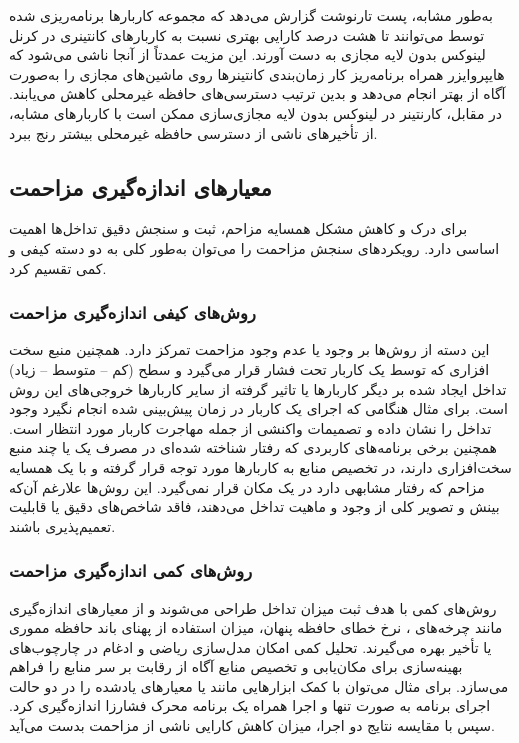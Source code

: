 به‌طور مشابه، پست تارنوشت  گزارش می‌دهد\cite{vmware2019vSphere} که مجموعه کاربارها برنامه‌ریزی شده توسط  می‌توانند تا هشت درصد کارایی بهتری نسبت به کاربارهای کانتینری در کرنل لینوکس بدون لایه مجازی به دست آورند. این مزیت عمدتاً از آنجا ناشی می‌شود که هایپروایزر  همراه برنامه‌ریز  کار زمان‌بندی کانتینرها روی ماشین‌های مجازی را به‌صورت آگاه از  بهتر انجام می‌دهد و بدین ترتیب دسترسی‌های حافظه غیرمحلی کاهش می‌یابند. در مقابل، کارنتینر در لینوکس بدون لایه مجازی‌سازی ممکن است با کاربارهای مشابه، از تأخیرهای ناشی از دسترسی حافظه غیرمحلی بیشتر رنج ببرد.

\subsection{معیارهای اندازه‌گیری مزاحمت}

برای درک و کاهش مشکل همسایه مزاحم، ثبت و سنجش دقیق تداخل‌ها اهمیت اساسی دارد. رویکردهای سنجش مزاحمت را می‌توان به‌طور کلی به دو دسته کیفی و کمی تقسیم کرد.

\subsubsection{روش‌های کیفی اندازه‌گیری مزاحمت}

این دسته از روش‌ها بر وجود یا عدم وجود مزاحمت تمرکز دارد. همچنین منبع سخت افزاری که توسط یک کاربار تحت فشار قرار می‌گیرد و سطح (کم – متوسط – زیاد) تداخل ایجاد شده بر دیگر کاربارها یا تاثیر گرفته از سایر کاربارها خروجی‌های این روش است. برای مثال هنگامی که اجرای یک کاربار در زمان پیش‌بینی شده انجام نگیرد وجود تداخل را نشان داده و تصمیمات واکنشی از جمله مهاجرت کاربار مورد انتظار است. همچنین برخی برنامه‌های کاربردی که رفتار شناخته شده‌ای در مصرف یک یا چند منبع سخت‌افزاری دارند، در تخصیص منابع به کاربارها مورد توجه قرار گرفته و با یک همسایه مزاحم که رفتار مشابهی دارد در یک مکان قرار نمی‌گیرد. این روش‌ها علارغم آن‌که بینش و تصویر کلی از وجود و ماهیت تداخل می‌دهند،‌ فاقد شاخص‌های دقیق یا قابلیت تعمیم‌پذیری باشند.

\subsubsection{روش‌های کمی اندازه‌گیری مزاحمت}

روش‌های کمی با هدف ثبت میزان تداخل طراحی می‌شوند و از معیارهای اندازه‌گیری مانند چرخه‌های ، نرخ خطای حافظه پنهان، میزان استفاده از پهنای باند حافظه مموری یا تأخیر  بهره می‌گیرند. تحلیل کمی امکان مدل‌سازی ریاضی و ادغام در چارچوب‌های بهینه‌سازی برای مکان‌یابی و تخصیص منابع آگاه از رقابت بر سر منابع را فراهم می‌سازد. برای مثال می‌توان با کمک ابزارهایی مانند  یا  معیارهای یادشده را در دو حالت اجرای برنامه به صورت تنها و اجرا همراه یک برنامه محرک فشارزا اندازه‌گیری کرد. سپس با مقایسه نتایج دو اجرا، میزان کاهش کارایی ناشی از مزاحمت بدست می‌آید.

